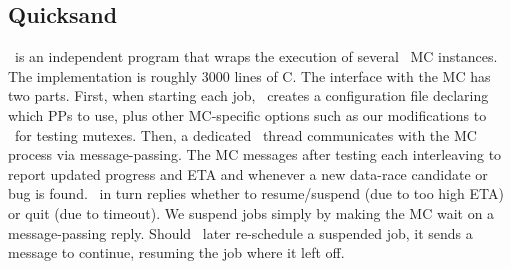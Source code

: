 \subsection{Quicksand}

\quicksand~is an independent program that wraps the execution of several \landslide~MC instances.
The implementation is roughly 3000 lines of C.
The interface with the MC has two parts. %
First, when starting each job, \quicksand~creates a configuration file declaring which PPs to use,
plus other MC-specific options such as our modifications to \landslide~for testing mutexes. %
Then, a dedicated \quicksand~thread communicates with the MC process via message-passing. %
The MC messages after testing each interleaving to report updated progress and ETA
and whenever a new data-race candidate or bug is found.
\quicksand~in turn replies whether to resume/suspend (due to too high ETA) or quit (due to timeout).
We suspend jobs simply by making the MC wait on a message-passing reply.
Should \quicksand~later re-schedule a suspended job, it sends a message to continue,
resuming the job where it left off.
